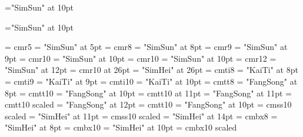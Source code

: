 %
\ifadobefont
  \def\song{Adobe Song Std}
  \def\hei{Adobe Heiti Std}
  \def\kai{Adobe Kaiti Std}
  \def\fang{Adobe Fangsong Std}
\else
  \def\song{SimSun}
  \def\hei{SimHei}
  \def\kai{KaiTi}
  \def\fang{FangSong}
\fi
%
\ifxecjk
  \font\CJKfont="\song" at 10pt
  
  \def\letfont{\let\CJKfont}
\else
  \font\zhfont="\song" at 10pt
  \def\zhpunctfont{\zhfont}
  
  \zhspacing
  \def\letfont{\let\zhfont}
\fi
%
\font\enfiverm = cmr5
\font\zhfiverm = "\song" at 5pt
\def\fiverm{\enfiverm\letfont\zhfiverm}
\font\eneightrm = cmr8
\font\zheightrm = "\song" at 8pt
\def\eightrm{\eneightrm\letfont\zheightrm}
\font\enninerm = cmr9 %
\font\zhninerm = "\song" at 9pt
\def\ninerm{\enninerm\letfont\zhninerm}
\font\entenrm = cmr10 %
\font\zhtenrm = "\song"  at 10pt
\def\tenrm{\entenrm\letfont\zhtenrm}
\font\enoldtenrm = cmr10 %
\font\zholdtenrm = "\song"  at 10pt
\def\oldtenrm{\enoldtenrm\letfont\zholdtenrm}
\font\entwelverm = cmr12
\font\zhtwelverm = "\song"  at 12pt
\def\twelverm{\entwelverm\letfont\zhtwelverm}
\font\entwentysixrm = cmr10 at 26pt
\font\zhtwentysixrm = "\hei"  at 26pt
\def\twentysixrm{\entwentysixrm\letfont\zhtwentysixrm}
%
\font\eneightit = cmti8
\font\zheightit = "\kai" at 8pt
\def\eightit{\eneightit\letfont\zheightit}
\font\ennineit = cmti9
\font\zheightit = "\kai" at 9pt
\def\nineit{\ennineit\letfont\zhnineit}
\font\entenit = cmti10
\font\zhtenit = "\kai" at 10pt
\def\tenit{\entenit\letfont\zhtenit}
%
\font\eneighttt = cmtt8
\font\zheighttt = "\fang" at 8pt
\def\eighttt{\eneighttt\letfont\zheighttt}
\font\ententt = cmtt10
\font\zhtentt = "\fang" at 10pt
\def\tentt{\ententt\letfont\zhtentt}
\font\eneleventt = cmtt10 at 11pt
\font\zheleventt = "\fang" at 11pt
\def\elventt{\enelventt\letfont\zhelventt}
\font\entwelvett = cmtt10 scaled 
\font\zhtwelvett = "\fang" at 12pt
\def\twelvett{\entwelvett\letfont\zhtwelvett}
%
\font\entenbt = cmtt10
\font\zhtenbt = "\fang" at 10pt
\def\tenbt{\entenbt\letfont\zhtenbt}
%
\font\enelevensf = cmss10 scaled\magstephalf
\font\zhelevensf = "\hei" at 11pt
\def\elevensf{\enelevensf\letfont\zhelevensf}
\font\enfourteensf = cmss10 scaled
\font\zhfourteensf = "\hei" at 14pt
\def\fourteensf{\enfourteensf\letfont\zhfourteensf}
%
\font\eneightbf = cmbx8
\font\zheightbf = "\hei" at 8pt
\def\eightbf{\eneightbf\letfont\zheightbf}
\font\entenbf = cmbx10
\font\zhtenbf = "\hei" at 10pt
\def\tenbf{\entenbf\letfont\zhtenbf}
\font\enelevenbf = cmbx10 scaled \magstephalf
